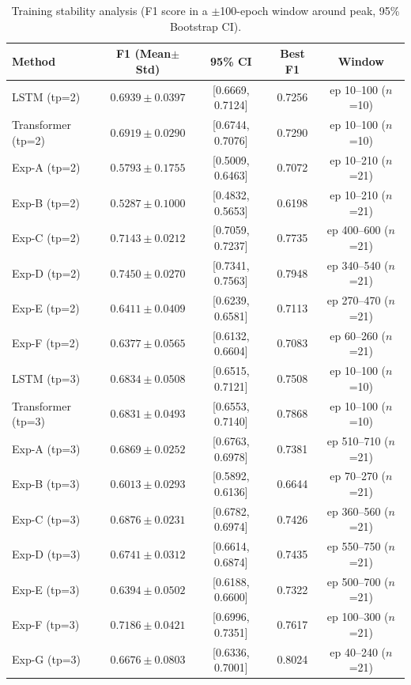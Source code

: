 \begin{table}[htbp]
\centering
\caption{Training stability analysis (F1 score in a $\pm$100-epoch window around peak, 95\% Bootstrap CI).}
\label{tab:stability}
\begin{tabular}{l c c c c}
\toprule
Method & F1 (Mean$\pm$Std) & 95\% CI & Best F1 & Window \\
\midrule
  LSTM (tp=2) & $0.6939 \pm 0.0397$ & [0.6669, 0.7124] & 0.7256 & ep 10--100 ($n$=10) \\
  Transformer (tp=2) & $0.6919 \pm 0.0290$ & [0.6744, 0.7076] & 0.7290 & ep 10--100 ($n$=10) \\
  Exp-A (tp=2) & $0.5793 \pm 0.1755$ & [0.5009, 0.6463] & 0.7072 & ep 10--210 ($n$=21) \\
  Exp-B (tp=2) & $0.5287 \pm 0.1000$ & [0.4832, 0.5653] & 0.6198 & ep 10--210 ($n$=21) \\
  Exp-C (tp=2) & $0.7143 \pm 0.0212$ & [0.7059, 0.7237] & 0.7735 & ep 400--600 ($n$=21) \\
  Exp-D (tp=2) & $0.7450 \pm 0.0270$ & [0.7341, 0.7563] & 0.7948 & ep 340--540 ($n$=21) \\
  Exp-E (tp=2) & $0.6411 \pm 0.0409$ & [0.6239, 0.6581] & 0.7113 & ep 270--470 ($n$=21) \\
  Exp-F (tp=2) & $0.6377 \pm 0.0565$ & [0.6132, 0.6604] & 0.7083 & ep 60--260 ($n$=21) \\
  \midrule
  LSTM (tp=3) & $0.6834 \pm 0.0508$ & [0.6515, 0.7121] & 0.7508 & ep 10--100 ($n$=10) \\
  Transformer (tp=3) & $0.6831 \pm 0.0493$ & [0.6553, 0.7140] & 0.7868 & ep 10--100 ($n$=10) \\
  Exp-A (tp=3) & $0.6869 \pm 0.0252$ & [0.6763, 0.6978] & 0.7381 & ep 510--710 ($n$=21) \\
  Exp-B (tp=3) & $0.6013 \pm 0.0293$ & [0.5892, 0.6136] & 0.6644 & ep 70--270 ($n$=21) \\
  Exp-C (tp=3) & $0.6876 \pm 0.0231$ & [0.6782, 0.6974] & 0.7426 & ep 360--560 ($n$=21) \\
  Exp-D (tp=3) & $0.6741 \pm 0.0312$ & [0.6614, 0.6874] & 0.7435 & ep 550--750 ($n$=21) \\
  Exp-E (tp=3) & $0.6394 \pm 0.0502$ & [0.6188, 0.6600] & 0.7322 & ep 500--700 ($n$=21) \\
  Exp-F (tp=3) & $0.7186 \pm 0.0421$ & [0.6996, 0.7351] & 0.7617 & ep 100--300 ($n$=21) \\
  Exp-G (tp=3) & $0.6676 \pm 0.0803$ & [0.6336, 0.7001] & 0.8024 & ep 40--240 ($n$=21) \\

\end{tabular}
\end{table}
